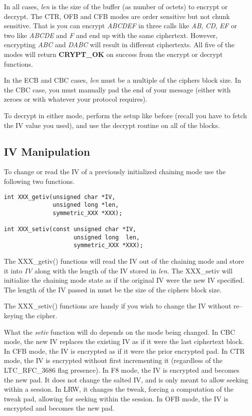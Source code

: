\documentclass[synpaper]{book}
\begin{document}
In all cases, \textit{len} is the size of the buffer (as number of octets) to encrypt or decrypt.  The CTR, OFB and CFB modes are order sensitive but not
chunk sensitive.  That is you can encrypt \textit{ABCDEF} in three calls like \textit{AB}, \textit{CD}, \textit{EF} or two like \textit{ABCDE} and \textit{F}
and end up with the same ciphertext.  However, encrypting \textit{ABC} and \textit{DABC} will result in different ciphertexts.  All
five of the modes will return {\bf CRYPT\_OK} on success from the encrypt or decrypt functions.

In the ECB and CBC cases, \textit{len} must be a multiple of the ciphers block size.  In the CBC case, you must manually pad the end of your message (either with
zeroes or with whatever your protocol requires).

To decrypt in either mode, perform the setup like before (recall you have to fetch the IV value you used), and use the decrypt routine on all of the blocks.

\subsection{IV Manipulation}
To change or read the IV of a previously initialized chaining mode use the following two functions.
     
 
\begin{verbatim}
int XXX_getiv(unsigned char *IV, 
              unsigned long *len, 
              symmetric_XXX *XXX);

int XXX_setiv(const unsigned char *IV, 
                    unsigned long  len, 
                    symmetric_XXX *XXX);
\end{verbatim}

The XXX\_getiv() functions will read the IV out of the chaining mode and store it into \textit{IV} along with the length of the IV 
stored in \textit{len}.  The XXX\_setiv will initialize the chaining mode state as if the original IV were the new IV specified.  The length
of the IV passed in must be the size of the ciphers block size.

The XXX\_setiv() functions are handy if you wish to change the IV without re--keying the cipher.  

What the \textit{setiv} function will do depends on the mode being changed.  In CBC mode, the new IV replaces the existing IV as if it 
were the last ciphertext block.  In CFB mode, the IV is encrypted as if it were the prior encrypted pad.  In CTR mode, the IV is encrypted without
first incrementing it (regardless of the LTC\_RFC\_3686 flag presence).  In F8 mode, the IV is encrypted and becomes the new pad.  It does not change
the salted IV, and is only meant to allow seeking within a session.  In LRW, it changes the tweak, forcing a computation of the tweak pad, allowing for
seeking within the session.  In OFB mode, the IV is encrypted and becomes the new pad.
\end{document}
